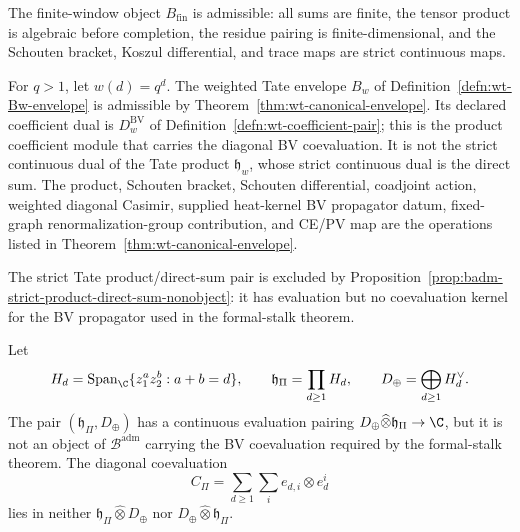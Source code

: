 \begin{rmk}
\label{rmk:badm-models}
The finite-window object \(B_{\mathrm{fin}}\) is admissible: all sums
are finite, the tensor product is algebraic before completion, the
residue pairing is finite-dimensional, and the Schouten bracket,
Koszul differential, and trace maps are strict continuous maps.

For \(q>1\), let \(w(d)=q^d\).  The weighted Tate envelope
\(B_w\) of Definition~\ref{defn:wt-Bw-envelope} is admissible by
Theorem~\ref{thm:wt-canonical-envelope}.  Its declared coefficient
dual is
\(D^{\mathrm{BV}}_w\) of
Definition~\ref{defn:wt-coefficient-pair}; this is the product
coefficient module that carries the diagonal BV coevaluation.  It is
not the strict continuous dual of the Tate product
\(\mathfrak h_w\), whose strict continuous dual is the direct sum.
The product, Schouten bracket, Schouten differential, coadjoint
action, weighted diagonal Casimir, supplied heat-kernel BV propagator
datum, fixed-graph renormalization-group contribution, and CE/PV map are
the operations listed in Theorem~\ref{thm:wt-canonical-envelope}.

The strict Tate product/direct-sum pair is excluded by
Proposition~\ref{prop:badm-strict-product-direct-sum-nonobject}: it has
evaluation but no coevaluation kernel for the BV propagator used in the
formal-stalk theorem.
\end{rmk}

\begin{prop}\label{prop:badm-strict-product-direct-sum-nonobject}
  Let
  \[
    H_d=\operatorname{Span}_{\C}\{z_1^az_2^b:a+b=d\},\qquad
    \mathfrak h_\Pi=\prod_{d\ge1}H_d,\qquad
    D_\oplus=\bigoplus_{d\ge1}H_d^\vee .
  \]
  The pair \((\mathfrak h_\Pi,D_\oplus)\) has a continuous evaluation
  pairing \(D_\oplus\widehat\otimes\mathfrak h_\Pi\to\C\), but it is
  not an object of \(\mathcal B^{\mathrm{adm}}\) carrying the BV
  coevaluation required by the formal-stalk theorem.  The diagonal
  coevaluation
  \[
    C_\Pi=\sum_{d\ge1}\sum_i e_{d,i}\otimes e^i_d
  \]
  lies in neither
  \(\mathfrak h_\Pi\widehat\otimes D_\oplus\) nor
  \(D_\oplus\widehat\otimes\mathfrak h_\Pi\).
\end{prop}

